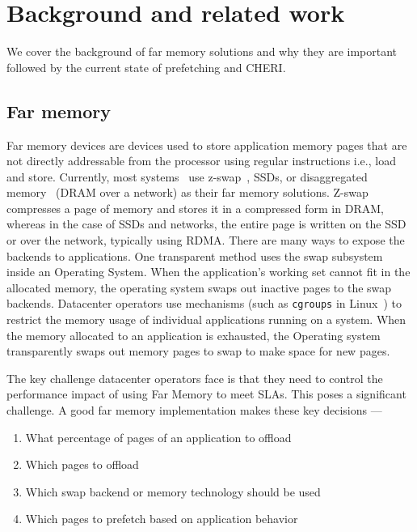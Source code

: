 \section{Background and related work}
We cover the background of far memory solutions and why they are important followed by the current state of prefetching and CHERI.

\subsection{Far memory}

Far memory devices are devices used to store application memory pages that are not directly addressable from the processor using regular instructions i.e., load and store. Currently, most systems~\cite{google,meta,fastswap,infiniswap} use z-swap~\cite{zswap-1}, SSDs, or disaggregated memory~\cite{leap, infiniswap} (DRAM over a network) as their far memory solutions. Z-swap compresses a page of memory and stores it in a compressed form in DRAM, whereas in the case of SSDs and networks, the entire page is written on the SSD or over the network, typically using RDMA. There are many ways to expose the backends to applications. One transparent method uses the swap subsystem inside an Operating System. When the application's working set cannot fit in the allocated memory, the operating system swaps out inactive pages to the swap backends. Datacenter operators use mechanisms (such as \texttt{cgroups} in Linux~\cite{cgroups}) to restrict the memory usage of individual applications running on a system. When the memory allocated to an application is exhausted, the Operating system transparently swaps out memory pages to swap to make space for new pages.  

The key challenge datacenter operators face is that they need to control the performance impact of using Far Memory to meet SLAs. This poses a significant challenge. A good far memory implementation makes these key decisions --- 
\begin{enumerate}
    \item What percentage of pages of an application to offload
    \item Which pages to offload 
    \item Which swap backend or memory technology should be used
    \item Which pages to prefetch based on application behavior
\end{enumerate} 

